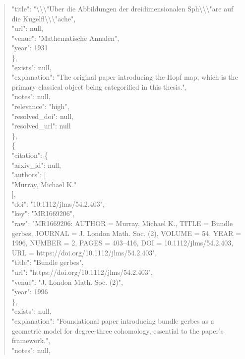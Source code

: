 \documentclass[11pt]{article}
\begin{document}
\begin{quote}
        "title": "\textbackslash{}\textbackslash{}\textbackslash{}"Uber die Abbildungen der dreidimensionalen Sph\textbackslash{}\textbackslash{}\textbackslash{}"are auf die Kugelfl\textbackslash{}\textbackslash{}\textbackslash{}"ache",\\
        "url": null,\\
        "venue": "Mathematische Annalen",\\
        "year": 1931\\
      \},\\
      "exists": null,\\
      "explanation": "The original paper introducing the Hopf map, which is the primary classical object being categorified in this thesis.",\\
      "notes": null,\\
      "relevance": "high",\\
      "resolved\_doi": null,\\
      "resolved\_url": null\\
    \},\\
    \{\\
      "citation": \{\\
        "arxiv\_id": null,\\
        "authors": [\\
          "Murray, Michael K."\\
        ],\\
        "doi": "10.1112/jlms/54.2.403",\\
        "key": "MR1669206",\\
        "raw": "MR1669206: AUTHOR = Murray, Michael K., TITLE = Bundle gerbes, JOURNAL = J. London Math. Soc. (2), VOLUME = 54, YEAR = 1996, NUMBER = 2, PAGES = 403--416, DOI = 10.1112/jlms/54.2.403, URL = https://doi.org/10.1112/jlms/54.2.403",\\
        "title": "Bundle gerbes",\\
        "url": "https://doi.org/10.1112/jlms/54.2.403",\\
        "venue": "J. London Math. Soc. (2)",\\
        "year": 1996\\
      \},\\
      "exists": null,\\
      "explanation": "Foundational paper introducing bundle gerbes as a geometric model for degree-three cohomology, essential to the paper's framework.",\\
      "notes": null,\\

\end{quote}
\end{document}
